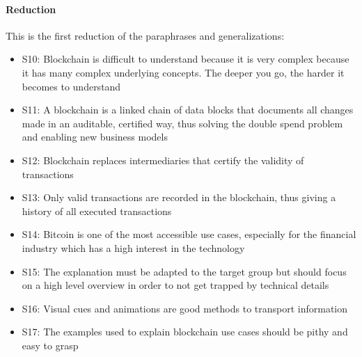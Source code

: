 \paragraph{Reduction} This is the first reduction of the paraphrases and generalizations: 
\begin{itemize}
    \item S10: Blockchain is difficult to understand because it is very complex because it has many complex underlying concepts. The deeper you go, the harder it becomes to understand 
    \item S11: A blockchain is a linked chain of data blocks that documents all changes made in an auditable, certified way, thus solving the double spend problem and enabling new business models 
    \item S12: Blockchain replaces intermediaries that certify the validity of transactions 
    \item S13: Only valid transactions are recorded in the blockchain, thus giving a history of all executed transactions 
    \item S14: Bitcoin is one of the most accessible use cases, especially for the financial industry which has a high interest in the technology
    \item S15: The explanation must be adapted to the target group but should focus on a high level overview in order to not get trapped by technical details 
    \item S16: Visual cues and animations are good methods to transport information
    \item S17: The examples used to explain blockchain use cases should be pithy and easy to grasp  
\end{itemize}


